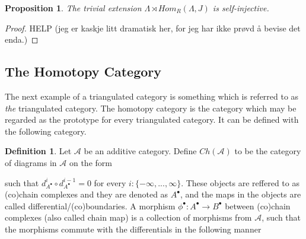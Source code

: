 \documentclass[11pt]{article}
\newtheorem{prop}[theorem]{Proposition}
\theoremstyle{definition}
\newtheorem{definition}{Definition}[section]
\theoremstyle{remark}
\newcommand{\chain}[1]{#1^{\bullet}}
\begin{document}
            \begin{prop}
                The trivial extension $\Lambda\rtimes Hom_R(\Lambda,J)$ is self-injective.
            \end{prop}

            \begin{proof}
                HELP (jeg er kaskje litt dramatisk her, for jeg har ikke prøvd å bevise det enda.)
            \end{proof}

        \subsection{The Homotopy Category}
            
            The next example of a triangulated category is something which is referred to as \emph{the} triangulated category. The homotopy category is the category which may be regarded as the prototype for every triangulated category. It can be defined with the following category.

            \begin{definition}
                Let $\mathcal{A}$ be an additive category. Define $Ch(\mathcal{A})$ to be the category of diagrams in $\mathcal{A}$ on the form
                \begin{center}
                \end{center}
                such that $d^i_{\chain{A}}\circ d^{i-1}_{\chain{A}}=0$ for every $i:\{-\infty,...,\infty\}$. These objects are reffered to as (co)chain complexes and they are denoted as $\chain{A}$, and the maps in the objects are called differential/(co)boundaries. A morphism $\chain{\phi} : \chain{A}\rightarrow \chain{B}$ between (co)chain complexes (also called chain map) is a collection of morphisms from $\mathcal{A}$, such that the morphisms commute with the differentials in the following manner
                \begin{center}
                \end{center}
            \end{definition}
\end{document}
